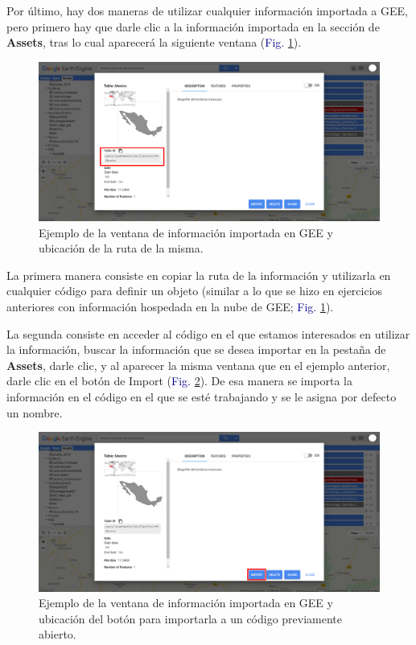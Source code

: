 \documentclass[
  12pt,
  letterpaper,
  twoside]{book}
\begin{document}
Por último, hay dos maneras de utilizar cualquier información importada a GEE, pero primero hay que darle clic a la información importada en la sección de \textbf{Assets}, tras lo cual aparecerá la siguiente ventana (\textcolor{darkblue}{Fig.} \ref{fig:f46}).

\begin{figure}[H]

{\centering \includegraphics[width=0.95\linewidth]{Img/Asset_ruta} 

}

\caption{Ejemplo de la ventana de información importada en GEE y ubicación de la ruta de la misma.}\label{fig:f46}
\end{figure}

La primera manera consiste en copiar la ruta de la información y utilizarla en cualquier código para definir un objeto (similar a lo que se hizo en ejercicios anteriores con información hospedada en la nube de GEE; \textcolor{darkblue}{Fig.} \ref{fig:f46}).

La segunda consiste en acceder al código en el que estamos interesados en utilizar la información, buscar la información que se desea importar en la pestaña de \textbf{Assets}, darle clic, y al aparecer la misma ventana que en el ejemplo anterior, darle clic en el botón de Import (\textcolor{darkblue}{Fig.} \ref{fig:f47}). De esa manera se importa la información en el código en el que se esté trabajando y se le asigna por defecto un nombre.

\begin{figure}[H]

{\centering \includegraphics[width=0.95\linewidth]{Img/Asset_ruta2} 

}

\caption{Ejemplo de la ventana de información importada en GEE y ubicación del botón para importarla a un código previamente abierto.}\label{fig:f47}
\end{figure}
\end{document}

